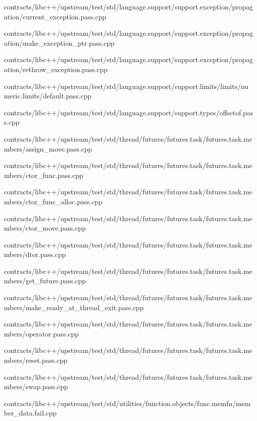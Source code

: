 \begin{DoxyCompactItemize}
contracts/libc++/upstream/test/std/language.\+support/support.\+exception/propagation/current\+\_\+exception.\+pass.\+cpp\item 
contracts/libc++/upstream/test/std/language.\+support/support.\+exception/propagation/make\+\_\+exception\+\_\+ptr.\+pass.\+cpp\item 
contracts/libc++/upstream/test/std/language.\+support/support.\+exception/propagation/rethrow\+\_\+exception.\+pass.\+cpp\item 
contracts/libc++/upstream/test/std/language.\+support/support.\+limits/limits/numeric.\+limits/default.\+pass.\+cpp\item 
contracts/libc++/upstream/test/std/language.\+support/support.\+types/offsetof.\+pass.\+cpp\item 
contracts/libc++/upstream/test/std/thread/futures/futures.\+task/futures.\+task.\+members/assign\+\_\+move.\+pass.\+cpp\item 
contracts/libc++/upstream/test/std/thread/futures/futures.\+task/futures.\+task.\+members/ctor\+\_\+func.\+pass.\+cpp\item 
contracts/libc++/upstream/test/std/thread/futures/futures.\+task/futures.\+task.\+members/ctor\+\_\+func\+\_\+alloc.\+pass.\+cpp\item 
contracts/libc++/upstream/test/std/thread/futures/futures.\+task/futures.\+task.\+members/ctor\+\_\+move.\+pass.\+cpp\item 
contracts/libc++/upstream/test/std/thread/futures/futures.\+task/futures.\+task.\+members/dtor.\+pass.\+cpp\item 
contracts/libc++/upstream/test/std/thread/futures/futures.\+task/futures.\+task.\+members/get\+\_\+future.\+pass.\+cpp\item 
contracts/libc++/upstream/test/std/thread/futures/futures.\+task/futures.\+task.\+members/make\+\_\+ready\+\_\+at\+\_\+thread\+\_\+exit.\+pass.\+cpp\item 
contracts/libc++/upstream/test/std/thread/futures/futures.\+task/futures.\+task.\+members/operator.\+pass.\+cpp\item 
contracts/libc++/upstream/test/std/thread/futures/futures.\+task/futures.\+task.\+members/reset.\+pass.\+cpp\item 
contracts/libc++/upstream/test/std/thread/futures/futures.\+task/futures.\+task.\+members/swap.\+pass.\+cpp\item 
contracts/libc++/upstream/test/std/utilities/function.\+objects/func.\+memfn/member\+\_\+data.\+fail.\+cpp\item 

\end{DoxyCompactItemize}
